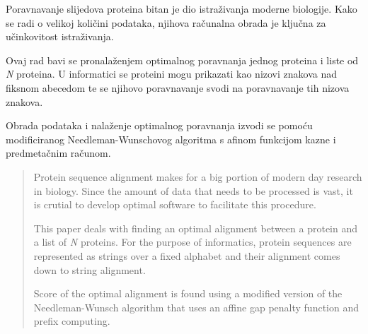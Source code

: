 \documentclass[times, utf8, zavrsni]{fer}
\begin{document}



\begin{sazetak}
\indent

Poravnavanje slijedova proteina bitan je dio istraživanja moderne biologije. Kako se radi o velikoj količini podataka, njihova računalna obrada je ključna za učinkovitost istraživanja.

Ovaj rad bavi se pronalaženjem optimalnog poravnanja jednog proteina i liste od \textit{N} proteina. U informatici se proteini mogu prikazati kao nizovi znakova nad fiksnom abecedom te se njihovo poravnavanje svodi na poravnavanje tih nizova znakova.

Obrada podataka i nalaženje optimalnog poravnanja izvodi se pomoću modificiranog Needleman-Wunschovog algoritma s afinom funkcijom kazne i predmetačnim računom.


\end{sazetak}

\begin{abstract}
Protein sequence alignment makes for a big portion of modern day research in biology. Since the amount of data that needs to be processed is vast, it is crutial to develop optimal software to facilitate this procedure.

This paper deals with finding an optimal alignment between a protein and a list of \textit{N} proteins. For the purpose of informatics, protein sequences are represented as strings over a fixed alphabet and their alignment comes down to string alignment.

Score of the optimal alignment is found using a modified version of the Needleman-Wunsch algorithm that uses an affine gap penalty function and prefix computing.


\end{abstract}
\end{document}
